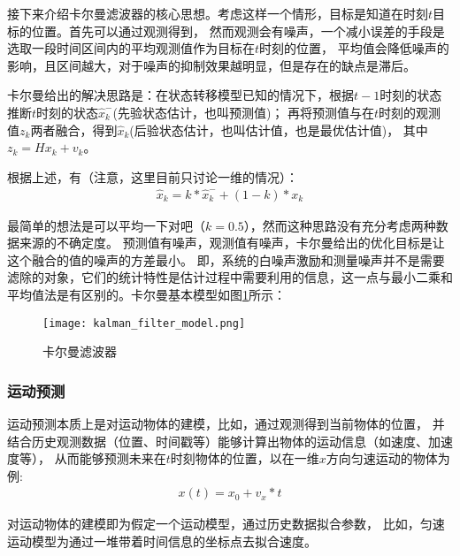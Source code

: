 接下来介绍卡尔曼滤波器的核心思想。考虑这样一个情形，目标是知道在时刻$t$目标的位置。首先可以通过观测得到，
然而观测会有噪声，一个减小误差的手段是选取一段时间区间内的平均观测值作为目标在$t$时刻的位置，
平均值会降低噪声的影响，且区间越大，对于噪声的抑制效果越明显，但是存在的缺点是滞后。\par

卡尔曼给出的解决思路是：在状态转移模型已知的情况下，根据$t-1$时刻的状态推断$t$时刻的状态$\hat{x}_k^{-}$(先验状态估计，也叫预测值)；
再将预测值与在$t$时刻的观测值$z_k$两者融合，得到$\hat{x}_k$(后验状态估计，也叫估计值，也是最优估计值)，
其中$z_k=Hx_k+v_k$。\par

根据上述，有（注意，这里目前只讨论一维的情况）：
\begin{gather}
    \hat{x}_k = k*\hat{x}_k^{-} + (1-k)*x_k
\end{gather}

最简单的想法是可以平均一下对吧（$k=0.5$），然而这种思路没有充分考虑两种数据来源的不确定度。
预测值有噪声，观测值有噪声，卡尔曼给出的优化目标是让这个融合的值的噪声的方差最小。
即，系统的白噪声激励和测量噪声并不是需要滤除的对象，它们的统计特性是估计过程中需要利用的信息，这一点与最小二乘和平均值法是有区别的。卡尔曼基本模型如图\ref{卡尔曼滤波器}所示：
\begin{figure}[H]
    \centering
    \texttt{[image: kalman\_filter\_model.png]} 
    \caption{卡尔曼滤波器} 
    \label{卡尔曼滤波器} 
\end{figure} 

\subsubsection{运动预测}


运动预测本质上是对运动物体的建模，比如，通过观测得到当前物体的位置，
并结合历史观测数据（位置、时间戳等）能够计算出物体的运动信息（如速度、加速度等），
从而能够预测未来在$t$时刻物体的位置，以在一维$x$方向匀速运动的物体为例: 
\begin{gather}
    x(t) = x_0 + v_x*t
\end{gather}

对运动物体的建模即为假定一个运动模型，通过历史数据拟合参数，
比如，匀速运动模型为通过一堆带着时间信息的坐标点去拟合速度。\par

